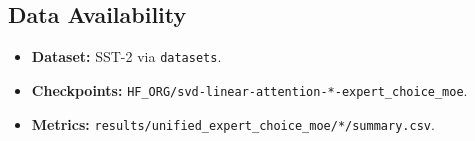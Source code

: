 \subsection{Data Availability}

\begin{itemize}
\item \textbf{Dataset:} SST-2 via \texttt{datasets}.
\item \textbf{Checkpoints:} \texttt{{{HF\_ORG}}/svd-linear-attention-*-expert\_choice\_moe}.
\item \textbf{Metrics:} \texttt{results/unified\_expert\_choice\_moe/*/summary.csv}.

\end{itemize}
